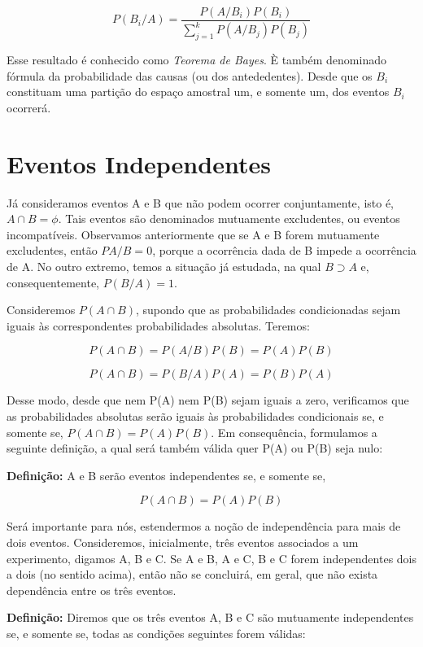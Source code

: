 \documentclass[a4paper,12pt]{report}
\begin{document}
{\begin{equation}\label{bayes}
    P(B_{i}/A)=\frac{P(A/B_{i})P(B_{i})}{\sum_{j=1}^{k}P(A/B_{j})P(B_{j})}
\end{equation}


Esse resultado é conhecido como \emph{Teorema de Bayes}. È também
denominado fórmula da probabilidade das causas (ou dos
antededentes). Desde que os $B_{i}$ constituam uma partição do
espaço amostral um, e somente um, dos eventos $B_{i}$ ocorrerá.


\section{Eventos Independentes}

Já consideramos eventos A e B que não podem ocorrer conjuntamente,
isto é, $A\cap B = \phi$. Tais eventos são denominados mutuamente
excludentes, ou eventos incompatíveis. Observamos anteriormente
que se A e B forem mutuamente excludentes, então $PA/B=0$, porque
a ocorrência dada de B impede a ocorrência de A. No outro extremo,
temos a situação já estudada, na qual $B \supset A$ e,
consequentemente, $P(B/A)=1$.\vskip0.3cm

Consideremos $P(A \cap B)$, supondo que as probabilidades
condicionadas sejam iguais às correspondentes probabilidades
absolutas. Teremos:

$$
P(A \cap B)= P(A/B)P(B)=P(A)P(B)
$$

$$
P(A \cap B)= P(B/A)P(A)=P(B)P(A)
$$


Desse modo, desde que nem P(A) nem P(B) sejam iguais a zero,
verificamos que as probabilidades absolutas serão iguais às
probabilidades condicionais se, e somente se, $P(A \cap
B)=P(A)P(B)$. Em consequência, formulamos a seguinte definição, a
qual será também válida quer P(A) ou P(B) seja nulo:\vskip0.3cm

\textbf{Definição:} A e B serão eventos independentes se, e
somente se,

$$
P(A \cap B) = P(A)P(B)
$$


Será importante para nós, estendermos a noção de independência
para mais de dois eventos. Consideremos, inicialmente, três
eventos associados a um experimento, digamos A, B e C. Se A e B, A
e C, B e C forem independentes dois a dois (no sentido acima),
então não se concluirá, em geral, que não exista dependência entre
os três eventos.\vskip0.3cm

\textbf{Definição:} Diremos que os três eventos A, B e C são
mutuamente independentes se, e somente se, todas as condições
seguintes forem válidas:

}
\end{document}
